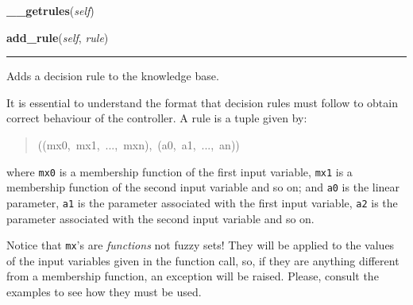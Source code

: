     \label{peach:fuzzy:control:Parametric:__getrules}

    \vspace{0.5ex}

    \begin{boxedminipage}{\textwidth}

    \raggedright \textbf{\_\_getrules}(\textit{self})

    \end{boxedminipage}

    \label{peach:fuzzy:control:Parametric:add_rule}

    \vspace{0.5ex}

    \begin{boxedminipage}{\textwidth}

    \raggedright \textbf{add\_rule}(\textit{self}, \textit{rule})

    \vspace{-1.5ex}

    \rule{\textwidth}{0.5\fboxrule}

Adds a decision rule to the knowledge base.

It is essential to understand the format that decision rules must follow
to obtain correct behaviour of the controller. A rule is a tuple given
by:
\begin{quote}{\ttfamily \raggedright \noindent
((mx0,~mx1,~...,~mxn),~(a0,~a1,~...,~an))
}\end{quote}

where \texttt{mx0} is a membership function of the first input variable,
\texttt{mx1} is a membership function of the second input variable and so on;
and \texttt{a0} is the linear parameter, \texttt{a1} is the parameter associated
with the first input variable, \texttt{a2} is the parameter associated with
the second input variable and so on.

Notice that \texttt{mx}'s are \emph{functions} not fuzzy sets! They will be
applied to the values of the input variables given in the function call,
so, if they are anything different from a membership function, an
exception will be raised. Please, consult the examples to see how they
must be used.
    \vspace{1ex}

    \end{boxedminipage}


